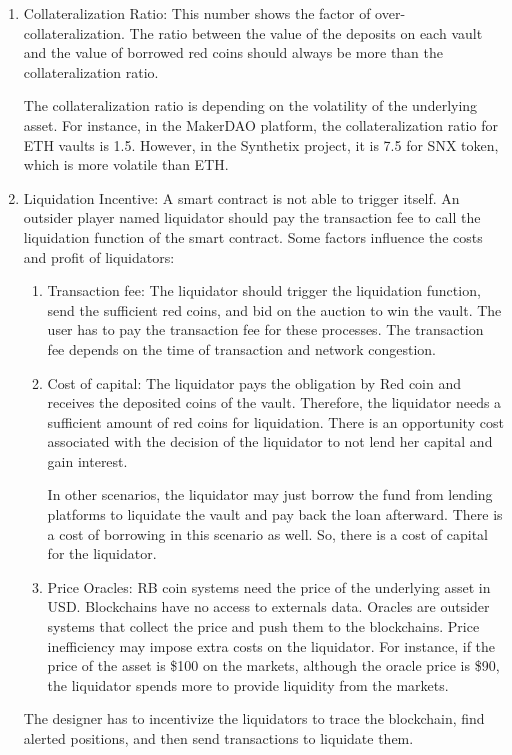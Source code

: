 \documentclass[runningheads]{llncs}
\begin{document}
\begin{enumerate}
  \item Collateralization Ratio:
This number shows the factor of over-collateralization. The ratio between the value of the deposits on each vault and the value of borrowed red coins should always be more than the collateralization ratio.
  
The collateralization ratio is depending on the volatility of the underlying asset. For instance, in the MakerDAO platform, the collateralization ratio for ETH vaults is 1.5. However, in the Synthetix project, it is 7.5 for SNX token, which is more volatile than ETH.
  \item Liquidation Incentive:
A smart contract is not able to trigger itself. An outsider player named liquidator should pay the transaction fee to call the liquidation function of the smart contract. Some factors influence the costs and profit of liquidators:
\begin{enumerate}
	\item Transaction fee:
The liquidator should trigger the liquidation function, send the sufficient red coins, and bid on the auction to win the vault. The user has to pay the transaction fee for these processes. The transaction fee depends on the time of transaction and network congestion.  
	\item Cost of capital: The liquidator pays the obligation by Red coin and receives the deposited coins of the vault. Therefore, the liquidator needs a sufficient amount of red coins for liquidation. There is an opportunity cost associated with the decision of the liquidator to not lend her capital and gain interest.

In other scenarios, the liquidator may just borrow the fund from lending platforms to liquidate the vault and pay back the loan afterward. There is a cost of borrowing in this scenario as well. So, there is a cost of capital for the liquidator.
	\item Price Oracles: RB coin systems need the price of the underlying asset in USD. Blockchains have no access to externals data. Oracles are outsider systems that collect the price and push them to the blockchains. Price inefficiency may impose extra costs on the liquidator. For instance, if the price of the asset is \$100 on the markets, although the oracle price is \$90, the liquidator spends more to provide liquidity from the markets.
\end{enumerate}  

The designer has to incentivize the liquidators to trace the blockchain, find alerted positions, and then send transactions to liquidate them. 


\end{enumerate}
\end{document}

